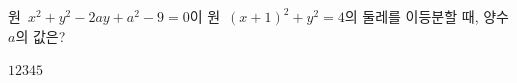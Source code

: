 원~$x^2+y^2-2ay+a^2-9=0$이 원~$(x+1)^2+y^2=4$의 둘레를 이등분할 때, 양수 $a$의 값은?
\begin{choices32}{$1$}{$2$}{$3$}{$4$}{$5$}\end{choices32}
